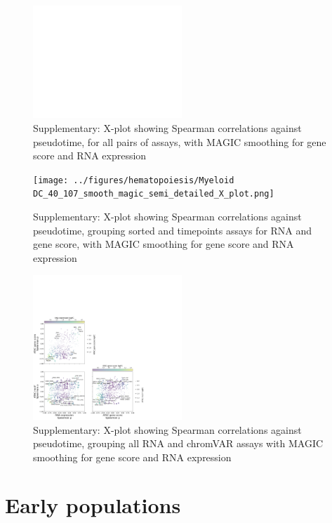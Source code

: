 \documentclass[a4paper]{article}
\begin{document}
\begin{figure}[!htb]
  \centering
  \includegraphics[width=0.5\textwidth]{../figures/hematopoiesis/Myeloid DC_40_107_smooth_magic_detailed_X_plot.png}
  \caption{Supplementary: X-plot showing Spearman correlations against pseudotime, for all pairs of assays, with MAGIC smoothing for gene score and RNA expression}
\end{figure}

\begin{figure}[!htb]
  \centering
  \texttt{[image: ../figures/hematopoiesis/Myeloid DC\_40\_107\_smooth\_magic\_semi\_detailed\_X\_plot.png]}
  \caption{Supplementary: X-plot showing Spearman correlations against pseudotime, grouping sorted and timepoints assays for RNA and gene score, with MAGIC smoothing for gene score and RNA expression}
\end{figure}

\begin{figure}[!htb]
  \centering
  \includegraphics[width=0.5\textwidth]{../figures/hematopoiesis/Myeloid DC_40_107_smooth_magic_grouped_X_plot.png}
  \caption{Supplementary: X-plot showing Spearman correlations against pseudotime, grouping all RNA and chromVAR assays with MAGIC smoothing for gene score and RNA expression}
\end{figure}


\FloatBarrier
\section{Early populations}
\end{document}

